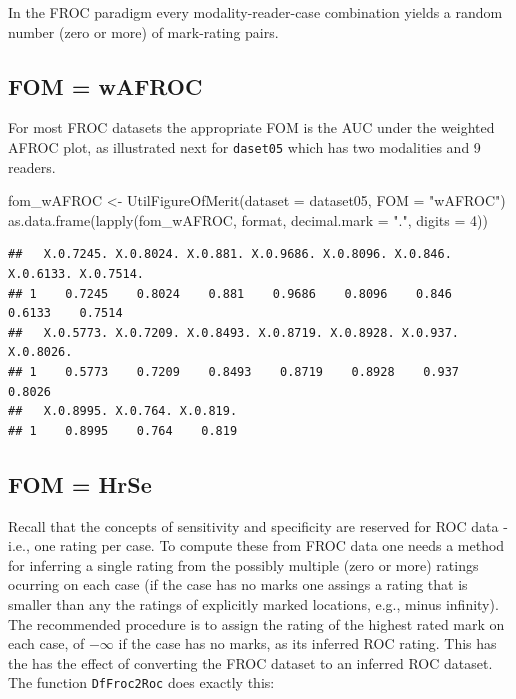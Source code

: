 \documentclass[
]{book}
\newenvironment{Shaded}{\begin{snugshade}}{\end{snugshade}}
\newcommand{\AttributeTok}[1]{\textcolor[rgb]{0.77,0.63,0.00}{#1}}
\newcommand{\DecValTok}[1]{\textcolor[rgb]{0.00,0.00,0.81}{#1}}
\newcommand{\FunctionTok}[1]{\textcolor[rgb]{0.00,0.00,0.00}{#1}}
\newcommand{\NormalTok}[1]{#1}
\newcommand{\OtherTok}[1]{\textcolor[rgb]{0.56,0.35,0.01}{#1}}
\newcommand{\StringTok}[1]{\textcolor[rgb]{0.31,0.60,0.02}{#1}}
\begin{document}
In the FROC paradigm every modality-reader-case combination yields a random number (zero or more) of mark-rating pairs.

\hypertarget{choice-of-fom-froc-wafroc}{%
\subsection{FOM = wAFROC}\label{choice-of-fom-froc-wafroc}}

For most FROC datasets the appropriate FOM is the AUC under the weighted AFROC plot, as illustrated next for \texttt{daset05} which has two modalities and 9 readers.

\begin{Shaded}
\begin{Highlighting}[]
\NormalTok{fom\_wAFROC }\OtherTok{\textless{}{-}} \FunctionTok{UtilFigureOfMerit}\NormalTok{(}\AttributeTok{dataset =}\NormalTok{ dataset05, }\AttributeTok{FOM =} \StringTok{"wAFROC"}\NormalTok{)}
\FunctionTok{as.data.frame}\NormalTok{(}\FunctionTok{lapply}\NormalTok{(fom\_wAFROC, format, }\AttributeTok{decimal.mark =} \StringTok{"."}\NormalTok{, }\AttributeTok{digits =} \DecValTok{4}\NormalTok{))}
\end{Highlighting}
\end{Shaded}

\begin{verbatim}
##   X.0.7245. X.0.8024. X.0.881. X.0.9686. X.0.8096. X.0.846. X.0.6133. X.0.7514.
## 1    0.7245    0.8024    0.881    0.9686    0.8096    0.846    0.6133    0.7514
##   X.0.5773. X.0.7209. X.0.8493. X.0.8719. X.0.8928. X.0.937. X.0.8026.
## 1    0.5773    0.7209    0.8493    0.8719    0.8928    0.937    0.8026
##   X.0.8995. X.0.764. X.0.819.
## 1    0.8995    0.764    0.819
\end{verbatim}

\hypertarget{choice-of-fom-froc-hrse}{%
\subsection{FOM = HrSe}\label{choice-of-fom-froc-hrse}}

Recall that the concepts of sensitivity and specificity are reserved for ROC data - i.e., one rating per case. To compute these from FROC data one needs a method for inferring a single rating from the possibly multiple (zero or more) ratings ocurring on each case (if the case has no marks one assings a rating that is smaller than any the ratings of explicitly marked locations, e.g., minus infinity). The recommended procedure is to assign the rating of the highest rated mark on each case, of \(-\infty\) if the case has no marks, as its inferred ROC rating. This has the has the effect of converting the FROC dataset to an inferred ROC dataset. The function \texttt{DfFroc2Roc} does exactly this:
\end{document}
